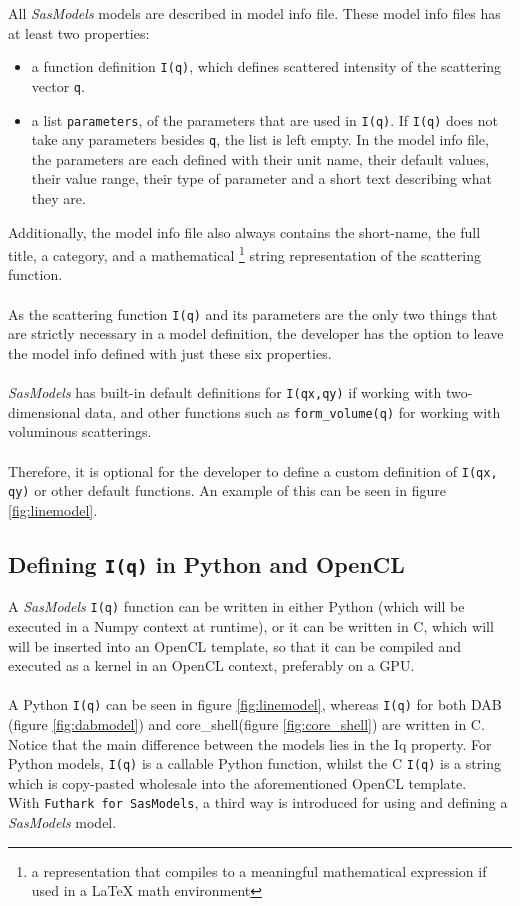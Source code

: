 \documentclass[11pt]{article}
\newcommand{\sasmodels}{\textit{SasModels}}
\newcommand{\iq}{\texttt{I(q)}}
\newcommand{\futhark}{\texttt{Futhark for SasModels}}
\begin{document}
All \sasmodels{} models are described in model info file. These model info 
files has at least two properties:
\begin{itemize}
  \item a function definition \iq{}, which defines scattered intensity 
  of the scattering vector \texttt{q}.

  \item a list \texttt{parameters}, of the parameters that are used in 
  \iq{}. If \iq{} does not take any parameters besides 
  \texttt{q}, the list is left empty.
  In the model info file, the parameters are each defined with their unit name, 
  their default values, their value range, their type of parameter and
  a short text describing what they are.
\end{itemize}

Additionally, the model info file also always contains the short-name, 
the full title, a category, and a mathematical \footnote{a representation 
that compiles to a meaningful mathematical expression if used in a LaTeX math 
environment} string representation of the scattering function.
\\\\
As the scattering function \iq{} and its parameters are the only 
two things that are strictly necessary in a model definition, the developer
has the option to leave the model info defined with just these six properties.
\\\\
\sasmodels{} has built-in default definitions for \texttt{I(qx,qy)} if working
with two-dimensional data, and other functions such as \texttt{form\_volume(q)}
for working with voluminous scatterings.
\\\\
Therefore, it is optional for the developer to define a custom definition
of \texttt{I(qx, qy)} or other default functions.
An example of this can be seen in figure \ref{fig:linemodel}.

\subsection{Defining \iq{} in Python and OpenCL}
A \sasmodels{} \iq{} function can be written in either Python (which will be
executed in a Numpy context at runtime), or it can be written in C, which will
will be inserted into an OpenCL template, so that it can be compiled and 
executed as a kernel in an OpenCL context, preferably on a GPU.
\\\\
A Python \iq{} can be seen in figure \ref{fig:linemodel}, whereas \iq{} for
both DAB 
(figure \ref{fig:dabmodel}) and core\_shell(figure \ref{fig:core_shell})
are written in C.
Notice that the main difference between the models lies in the Iq property.
For Python models, \iq{} is a callable Python function, whilst the C \iq{} is a
 string which is copy-pasted wholesale into the aforementioned OpenCL template.
\\
With \futhark{}, a third way is introduced for using and defining a \sasmodels{} model.
\end{document}
